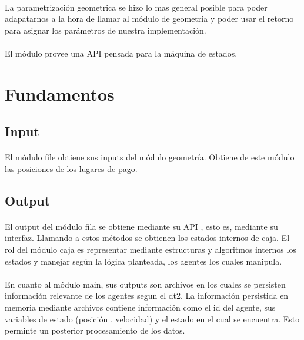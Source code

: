 \documentclass{article}
\begin{document}
\paragraph{}
La parametrización geometrica se hizo lo mas general posible para poder adapatarnos a la hora de llamar al módulo de geometría y poder usar el retorno para asignar los parámetros de nuestra implementación.
\paragraph{}
El módulo provee una API pensada para la máquina de estados.

\section{Fundamentos}

\subsection{Input}

\paragraph{}
El módulo file obtiene sus inputs del módulo geometría. Obtiene de este módulo las posiciones de los lugares de pago.

\subsection{Output}
\paragraph{}
El output del módulo fila se obtiene mediante su API , esto es, mediante su interfaz. Llamando a estos métodos se obtienen los estados internos de caja. El rol del módulo caja es representar mediante estructuras y algoritmos internos los estados y manejar
según la lógica planteada, los agentes los cuales manipula.
\paragraph{}
En cuanto al módulo main, sus outputs son archivos en los cuales se persisten información relevante de los agentes segun el dt2. La información persistida en memoria mediante archivos contiene información como el id del agente, sus variables de estado 
(posición , velocidad) y el estado en el cual se encuentra. Esto perminte un posterior procesamiento de los datos.
\end{document}
